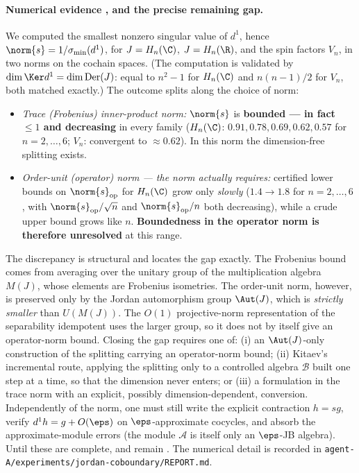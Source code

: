 \paragraph{Numerical evidence , and the precise remaining gap.}
We computed the smallest nonzero singular value of $d^{1}$, hence
$\norm{s}=1/\sigma_{\min}(d^{1})$, for $J=H_{n}(\C)$, $J=H_{n}(\R)$, and the
spin factors $V_{n}$, in two norms on the cochain spaces. (The computation is
validated by $\dim\Ker d^{1}=\dim\mathrm{Der}(J)$: equal to $n^{2}-1$ for
$H_{n}(\C)$ and $n(n-1)/2$ for $V_{n}$, both matched exactly.) The outcome
splits along the choice of norm:
\begin{itemize}[leftmargin=*]
\item \emph{Trace (Frobenius) inner-product norm:} $\norm{s}$ is
\textbf{bounded --- in fact $\le 1$ and decreasing} in every family
($H_{n}(\C)$: $0.91,0.78,0.69,0.62,0.57$ for $n=2,\dots,6$; $V_{n}$:
convergent to $\approx0.62$). In this norm the dimension-free splitting exists.
\item \emph{Order-unit (operator) norm --- the norm 
actually requires:} certified lower bounds on $\norm{s}_{\mathrm{op}}$ for
$H_{n}(\C)$ grow only \emph{slowly} ($1.4\to1.8$ for $n=2,\dots,6$, with
$\norm{s}_{\mathrm{op}}/\sqrt n$ and $\norm{s}_{\mathrm{op}}/n$ both decreasing),
while a crude upper bound grows like $n$. \textbf{Boundedness in the operator
norm is therefore unresolved} at this range.
\end{itemize}
The discrepancy is structural and locates the gap exactly. The Frobenius bound
comes from averaging over the unitary group of the multiplication algebra
$M(J)$, whose elements are Frobenius isometries. The order-unit norm, however,
is preserved only by the Jordan automorphism group $\Aut(J)$, which is
\emph{strictly smaller} than $U(M(J))$. The $O(1)$ projective-norm
representation of the separability idempotent uses the larger group, so it does
not by itself give an operator-norm bound. Closing the gap requires one of:
(i) an $\Aut(J)$-only construction of the splitting carrying an operator-norm
bound; (ii) Kitaev's incremental route, applying the splitting only to a
controlled algebra $\mathcal{B}$ built one step at a time, so that the dimension
never enters; or (iii) a formulation in the trace norm with an explicit,
possibly dimension-dependent, conversion. Independently of the norm, one must
still write the explicit contraction $h=sg$, verify $d^{1}h=g+O(\eps)$ on
$\eps$-approximate cocycles, and absorb the approximate-module errors (the
module $\mathcal{A}$ is itself only an $\eps$-JB algebra). Until these are
complete,  and  remain
. The numerical detail is recorded in
\texttt{agent-A/experiments/jordan-coboundary/REPORT.md}.
